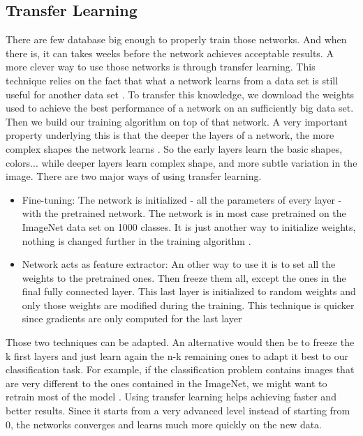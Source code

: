 \subsection{Transfer Learning} \label{sec:translearn}
There are few database big enough to properly train those networks. And when there is, it can takes weeks before the network achieves acceptable results. A more clever way to use those networks is through transfer learning. This technique relies on the fact that what a network learns from a data set is still useful for another data set \cite{translearnsurvey}. To transfer this knowledge,  we download the weights used to achieve the best performance of a network on an sufficiently big data set. Then we build our training algorithm on top of that network. A very important property underlying this is that the deeper the layers of a network, the more complex shapes the network learns \cite{layerslearn}. So the early layers learn the basic shapes, colors... while deeper layers learn complex shape, and more subtle variation in the image. 
There are two major ways of using transfer learning. 
\begin{itemize}
    \item Fine-tuning: The network is initialized - all the parameters of every layer - with the pretrained network. The network is in most case pretrained on the ImageNet data set on 1000 classes. It is just another way to initialize weights, nothing is changed further in the training algorithm \cite{cs231n}.
    \item Network acts as feature extractor: An other way to use it is to set all the weights to the pretrained ones. Then freeze them all, except the ones in the final fully connected layer. This last layer is initialized to random weights and only those weights are modified during the training. 
    This technique is quicker since gradients are only computed for the last layer
\end{itemize}
Those two techniques can be adapted.  An alternative would then be to freeze the k first layers and just learn again the n-k remaining ones to adapt it best to our classification task. For example, if the classification problem contains images that are very different to the ones contained in the ImageNet, we might want to retrain most of the model \cite{translearnsurvey}. 
Using transfer learning helps achieving faster and better results. Since it starts from a very advanced level instead of starting from 0, the networks converges and learns much more quickly on the new data.

